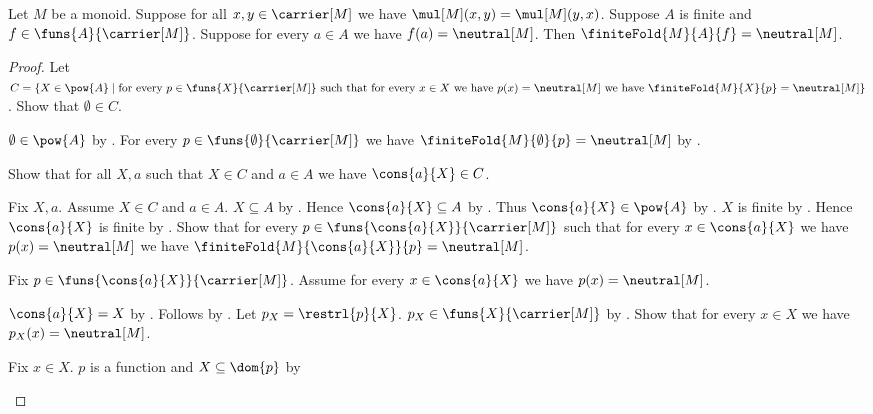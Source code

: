 \begin{theorem}\label{monoid_finite_fold_all_neutral}
    Let $M$ be a monoid.
    Suppose for all $x,y\in\carrier[M]$ we have
        $\mul[M](x,y)=\mul[M](y,x)$.
    Suppose $A$ is finite and $f\in\funs{A}{\carrier[M]}$.
    Suppose for every $a\in A$ we have $f(a)=\neutral[M]$.
    Then $\finiteFold{M}{A}{f}=\neutral[M]$.
\end{theorem}
\begin{proof}
    Let $C=\{X\in\pow{A}\mid
        \text{for every $p\in\funs{X}{\carrier[M]}$ such that
            for every $x\in X$ we have $p(x)=\neutral[M]$ we have
            $\finiteFold{M}{X}{p}=\neutral[M]$}\}$.
    Show that $\emptyset\in C$.
    \begin{subproof}
        $\emptyset\in\pow{A}$ by .
        For every $p\in\funs{\emptyset}{\carrier[M]}$ we have
            $\finiteFold{M}{\emptyset}{p}=\neutral[M]$ by
            .
    \end{subproof}
    Show that for all $X,a$ such that $X\in C$ and $a\in A$ we have
        $\cons{a}{X}\in C$.
    \begin{subproof}
        Fix $X,a$.
        Assume $X\in C$ and $a\in A$.
        $X\subseteq A$ by .
        Hence $\cons{a}{X}\subseteq A$ by .
        Thus $\cons{a}{X}\in\pow{A}$ by .
        $X$ is finite by .
        Hence $\cons{a}{X}$ is finite by .
        Show that for every $p\in
            \funs{\cons{a}{X}}{\carrier[M]}$ such that
            for every $x\in\cons{a}{X}$ we have
                $p(x)=\neutral[M]$ we have
            $\finiteFold{M}{\cons{a}{X}}{p}=\neutral[M]$.
        \begin{subproof}
            Fix $p\in\funs{\cons{a}{X}}{\carrier[M]}$.
            Assume for every $x\in\cons{a}{X}$ we have
                $p(x)=\neutral[M]$.
            \begin{byCase}
                $\cons{a}{X}=X$ by .
                Follows by \auto.
                Let $p_X=\restrl{p}{X}$.
                $p_X\in\funs{X}{\carrier[M]}$ by
                    .
                Show that for every $x\in X$ we have
                    $p_X(x)=\neutral[M]$.
                \begin{subproof}
                    Fix $x\in X$.
                    $p$ is a function and $X\subseteq\dom{p}$ by

\end{subproof}
\end{byCase}
\end{subproof}
\end{subproof}
\end{proof}
